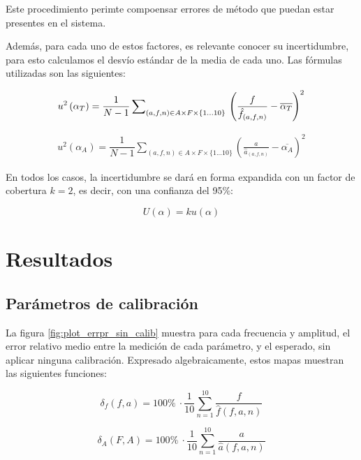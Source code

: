 \documentclass[conference]{IEEEtran}
\begin{document}
Este procedimiento perimte compoensar errores de método que puedan estar presentes
en el sistema. 


Además, para cada uno de estos factores, es relevante conocer su incertidumbre,
para esto calculamos el desvío estándar de la media de cada uno. Las fórmulas
utilizadas son las siguientes:


\begin{equation}
u^2 \left( \alpha_{T} \right) = \dfrac{1}{N - 1} \sum_{(a,f,n) \in A \times F
\times \{1...10 \}}\nolimits \\\left( \frac{f}{\hat{f}_{(a,f,n)}} - \overline{\alpha_{T}}
\right)^2
\label{eqn:alpha_f_u}
\end{equation}


\begin{equation}
\begin{split}
u^2 \left( \alpha_{A} \right) = \dfrac{1}{N - 1} \sum_{(a,f,n) \in A \times F
\times \{1...10 \}}\nolimits \left( \frac{a}{\hat{a}_{(a,f,n)}} - \overline{\alpha_{A}}
\right)^2 
\label{eqn:alpha_a_u}
\end{split}
\end{equation}

En todos los casos, la incertidumbre se dará en forma expandida con un factor de
cobertura $k = 2$, es decir, con una confianza del 95\%:

$$U(\alpha) = k u(\alpha)$$






 

\section{Resultados}

\subsection{Parámetros de calibración}

La figura \ref{fig:plot_errpr_sin_calib} muestra para cada frecuencia y amplitud,
el error relativo medio entre la medición de cada parámetro, y el esperado, sin aplicar
ninguna calibración.
Expresado algebraicamente, estos mapas muestran las siguientes funciones:

$$ \delta_{f} \left(f, a\right) = 100 \% ~ \cdot \dfrac{1}{10} \sum_{n=1}^{10}
\dfrac{f}{\hat{f}(f,a,n)}$$
 

$$ \delta_{A} \left(F, A\right) = 100 \% ~ \cdot \dfrac{1}{10} \sum_{n=1}^{10}
\dfrac{a}{\hat{a}(f,a,n)}$$
\end{document}
